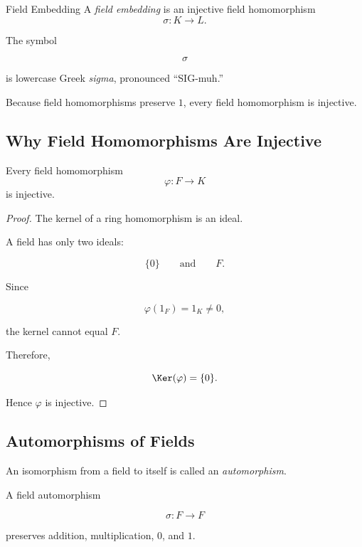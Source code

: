 \begin{definitionbox}{Field Embedding}
A \emph{field embedding} is an injective field homomorphism
\[ \sigma:K\to L. \]
\end{definitionbox}

The symbol

\[ \sigma \]

is lowercase Greek \emph{sigma}, pronounced ``SIG-muh.''

Because field homomorphisms preserve \(1\), every field homomorphism is
injective.

\subsection{Why Field Homomorphisms Are Injective}
\label{subsec:field-homomorphism-injective}

\begin{theorem}
Every field homomorphism
\[ \varphi:F\to K \]
is injective.
\end{theorem}

\begin{proof}
The kernel of a ring homomorphism is an ideal.

A field has only two ideals:

\[ \{0\}\qquad\text{and}\qquad F. \]

Since

\[ \varphi(1_F)=1_K\neq0, \]

the kernel cannot equal \(F\).

Therefore,

\[ \Ker(\varphi)=\{0\}. \]

Hence \(\varphi\) is injective.
\end{proof}

\subsection{Automorphisms of Fields}
\label{subsec:field-automorphisms}

An isomorphism from a field to itself is called an
\emph{automorphism}.

A field automorphism

\[ \sigma:F\to F \]

preserves addition, multiplication, \(0\), and \(1\).

